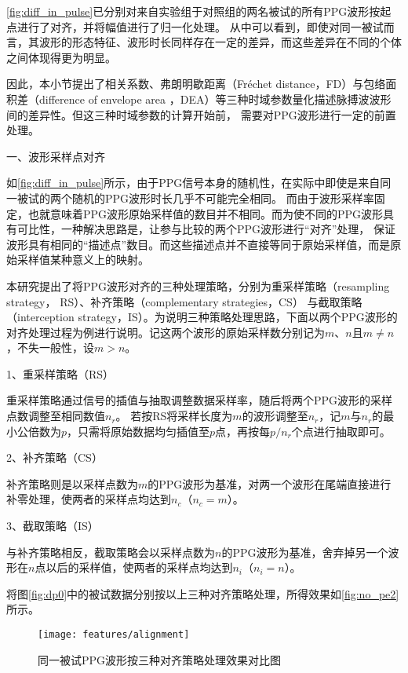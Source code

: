 \autoref{fig:diff_in_pulse}已分别对来自实验组于对照组的两名被试的所有PPG波形按起点进行了对齐，并将幅值进行了归一化处理。
从中可以看到，即使对同一被试而言，其波形的形态特征、波形时长同样存在一定的差异，而这些差异在不同的个体之间体现得更为明显。

因此，本小节提出了相关系数、弗朗明歇距离（Fréchet distance，FD）与包络面积差（difference of envelope area ，DEA）等三种时域参数量化描述脉搏波波形间的差异性。但这三种时域参数的计算开始前，
需要对PPG波形进行一定的前置处理。

一、波形采样点对齐

如\autoref{fig:diff_in_pulse}所示，由于PPG信号本身的随机性，在实际中即使是来自同一被试的两个随机的PPG波形时长几乎不可能完全相同\cite{Qiu2012,PPGYY,Ma2015}。
而由于波形采样率固定，也就意味着PPG波形原始采样值的数目并不相同。而为使不同的PPG波形具有可比性，一种解决思路是，让参与比较的两个PPG波形进行“对齐”处理，
保证波形具有相同的“描述点”数目。而这些描述点并不直接等同于原始采样值，而是原始采样值某种意义上的映射。

本研究提出了将PPG波形对齐的三种处理策略，分别为重采样策略（resampling strategy， RS）、补齐策略（complementary strategies，CS）
与截取策略（interception strategy，IS）。为说明三种策略处理思路，下面以两个PPG波形的对齐处理过程为例进行说明。记这两个波形的原始采样数分别记为$m$、$n$且$m \neq n$，不失一般性，设$m>n$。

1、重采样策略（RS）

重采样策略通过信号的插值与抽取调整数据采样率，随后将两个PPG波形的采样点数调整至相同数值$n_r$。
若按RS将采样长度为$m$的波形调整至$n_r$，记$m$与$n_r$的最小公倍数为$p$，只需将原始数据均匀插值至$p$点，再按每$p/n_r$个点进行抽取即可。

2、补齐策略（CS）

补齐策略则是以采样点数为$m$的PPG波形为基准，对两一个波形在尾端直接进行补零处理，使两者的采样点均达到$n_c$（$n_c=m$）。

3、截取策略（IS）

与补齐策略相反，截取策略会以采样点数为$n$的PPG波形为基准，舍弃掉另一个波形在$n$点以后的采样值，使两者的采样点均达到$n_i$（$n_i=n$）。

将图\autoref{fig:dp0}中的被试数据分别按以上三种对齐策略处理，所得效果如\autoref{fig:no_pe2}所示。

\begin{figure}[htbp]
    \centering
    \texttt{[image: features/alignment]}
    \caption{\label{fig:no_pe2}同一被试PPG波形按三种对齐策略处理效果对比图}
\end{figure}

